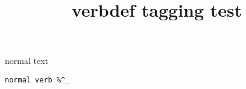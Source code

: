 \documentclass{article}
\title{verbdef tagging test}
\begin{document}
\tableofcontents

\bigskip

normal text

\demo

\demotwo

\stardemo

\verb|normal verb %^_|
     
\section{\demo}
\end{document}
